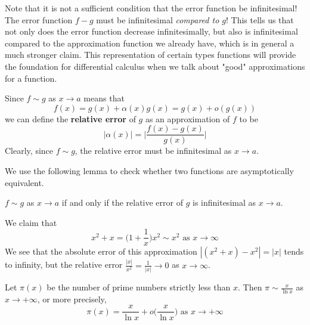     Note that it is not a sufficient condition that the error function be infinitesimal! The error function $f-g$ must be infinitesimal \textit{compared to $g$}! This tells us that not only does the error function decrease infinitesimally, but also is infinitesimal compared to the approximation function we already have, which is in general a much stronger claim. This representation of certain types functions will provide the foundation for differential calculus when we talk about "good" approximations for a function. 


    \begin{definition}
      Since $f \sim g$ as $x \rightarrow a$ means that 
      \begin{equation}
        f(x) = g(x) + \alpha(x) g(x) = g(x) + o(g(x))
      \end{equation}
      we can define the \textbf{relative error} of $g$ as an approximation of $f$ to be
      \begin{equation}
        |\alpha(x)| = \bigg| \frac{f(x) - g(x)}{g(x)} \bigg|
      \end{equation}
      Clearly, since $f \sim g$, the relative error must be infinitesimal as $x \rightarrow a$. 
    \end{definition}

    We use the following lemma to check whether two functions are asymptotically equivalent. 
    \begin{lemma}
      $f \sim g$ as $x \rightarrow a$ if and only if the relative error of $g$ is infinitesimal as $x \rightarrow a$. 
    \end{lemma}

    \begin{example}
      We claim that 
      \begin{equation}
        x^2 + x = \bigg(1 + \frac{1}{x} \bigg) x^2 \sim x^2 \text{ as } x \rightarrow \infty
      \end{equation}
      We see that the absolute error of this approximation $|(x^2 + x) - x^2| = |x|$ tends to infinity, but the relative error $\frac{|x|}{x^2} = \frac{1}{|x|} \rightarrow 0$ as $x \rightarrow \infty$. 
    \end{example}

    \begin{theorem}
      Let $\pi(x)$ be the number of prime numbers strictly less than $x$. Then $\pi \sim \frac{x}{\ln{x}}$ as $x\rightarrow + \infty$, or more precisely, 
      \begin{equation}
        \pi(x) = \frac{x}{\ln{x}} + o \bigg( \frac{x}{\ln{x}}\bigg) \text{ as } x \rightarrow +\infty
      \end{equation}
    \end{theorem}

